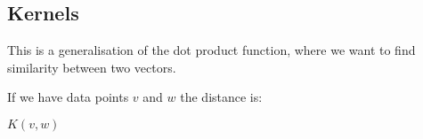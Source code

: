 
\subsection{Kernels}

This is a generalisation of the dot product function, where we want to find similarity between two vectors.

If we have data points \(v\) and \(w\) the distance is:

\(K(v, w)\)

